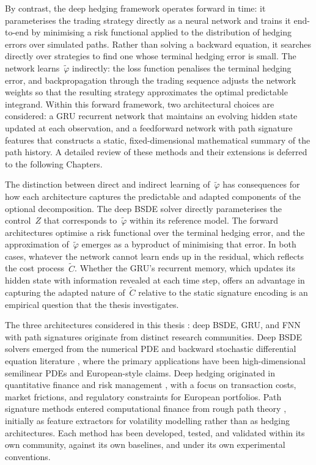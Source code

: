 By contrast, the deep hedging framework
\citep{BuehlerGononTeichmannWood2019} operates forward in time: it
parameterises the trading strategy directly as a neural network and trains
it end-to-end by minimising a risk functional applied to the distribution
of hedging errors over simulated paths.  Rather than solving a backward
equation, it searches directly over strategies to find one whose terminal
hedging error is small.  The network learns~$\tilde{\varphi}$ indirectly:
the loss function penalises the terminal hedging error, and
backpropagation through the trading sequence adjusts the network weights so
that the resulting strategy approximates the optimal predictable integrand.
Within this forward framework, two architectural choices are considered: a
GRU recurrent network \citep{Cho2014} that maintains an evolving hidden
state updated at each observation, and a feedforward network with path
signature features \citep{Horvath2021} that constructs a static,
fixed-dimensional mathematical summary of the path history.  A detailed
review of these methods and their extensions is deferred to the following Chapters.

The distinction between direct and indirect learning
of~$\tilde{\varphi}$ has consequences for how each architecture captures
the predictable and adapted components of the optional decomposition.  The
deep BSDE solver directly parameterises the control~$Z$ that corresponds
to~$\tilde{\varphi}$ within its reference model.  The forward
architectures optimise a risk functional over the terminal hedging error,
and the approximation of~$\tilde{\varphi}$ emerges as a byproduct of
minimising that error.  In both cases, whatever the network cannot learn
ends up in the residual, which reflects the cost
process~$\tilde{C}$.  Whether the GRU's recurrent memory, which updates
its hidden state with information revealed at each time step, offers an
advantage in capturing the adapted nature of~$\tilde{C}$ relative to the
static signature encoding is an empirical question that the thesis
investigates.

The three architectures considered in this thesis : deep BSDE, GRU, and
FNN with path signatures originate from distinct research communities.
Deep BSDE solvers emerged from the numerical PDE and backward stochastic
differential equation literature \citep{HanJentzenE2018, PardouxPeng1990},
where the primary applications have been high-dimensional semilinear PDEs
and European-style claims.  Deep hedging originated in quantitative finance
and risk management \citep{BuehlerGononTeichmannWood2019}, with a focus on
transaction costs, market frictions, and regulatory constraints for
European portfolios.  Path signature methods entered computational finance
from rough path theory \citep{Horvath2021, LyonsCaruanaLevy2007}, initially as
feature extractors for volatility modelling rather than as hedging
architectures.  Each method has been developed, tested, and validated
within its own community, against its own baselines, and under its own
experimental conventions.  

